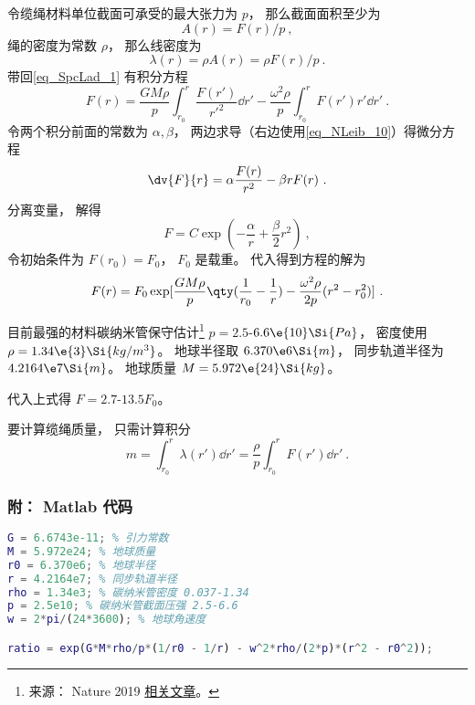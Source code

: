 令缆绳材料单位截面可承受的最大张力为 $p$， 那么截面面积至少为
\begin{equation}
A(r) = F(r)/p~,
\end{equation}
绳的密度为常数 $\rho$， 那么线密度为
\begin{equation}
\lambda(r) = \rho A(r) = \rho F(r)/p~.
\end{equation}
带回\autoref{eq_SpcLad_1} 有积分方程
\begin{equation}
F(r) = \frac{GM\rho}{p} \int_{r_0}^{r} \frac{F(r')}{r'^2} \dd{r'} - \frac{\omega^2\rho}{p}\int_{r_0}^r F(r') r' \dd{r'}~.
\end{equation}
令两个积分前面的常数为 $\alpha, \beta$， 两边求导（右边使用\autoref{eq_NLeib_10}）得微分方程
\begin{equation}
\dv{F}{r} = \alpha \frac{F(r)}{r^2} - \beta r F(r)~.
\end{equation}
分离变量， 解得
\begin{equation}
F = C\exp(-\frac{\alpha}{r} + \frac{\beta}{2} r^2)~,
\end{equation}
令初始条件为 $F(r_0) = F_0$， $F_0$ 是载重。 代入得到方程的解为
\begin{equation}
F(r) = F_0 \exp[\frac{GM\rho}{p} \qty(\frac{1}{r_0} - \frac{1}{r}) - \frac{\omega^2\rho}{2p}(r^2 - r_0^2)]~.
\end{equation}

目前最强的材料碳纳米管保守估计\footnote{来源： Nature 2019 \href{https://www.nature.com/articles/s41467-019-10959-7}{相关文章}。} $p = 2.5$-$6.6\e{10} \Si{Pa}$， 密度使用 $\rho = 1.34\e{3} \Si{kg/m^3}$。 地球半径取 $6.370\e6\Si{m}$， 同步轨道半径为 $4.2164\e7 \Si{m}$。 地球质量 $M = 5.972\e{24} \Si{kg}$。

代入上式得 $F = 2.7$-$13.5 F_0$。

要计算缆绳质量， 只需计算积分
\begin{equation}
m = \int_{r_0}^{r} \lambda(r') \dd{r'} = \frac{\rho}{p} \int_{r_0}^{r} F(r') \dd{r'}~.
\end{equation}

\subsubsection{附： Matlab 代码}
\begin{lstlisting}[language=matlab]
G = 6.6743e-11; % 引力常数
M = 5.972e24; % 地球质量
r0 = 6.370e6; % 地球半径
r = 4.2164e7; % 同步轨道半径
rho = 1.34e3; % 碳纳米管密度 0.037-1.34
p = 2.5e10; % 碳纳米管截面压强 2.5-6.6
w = 2*pi/(24*3600); % 地球角速度

ratio = exp(G*M*rho/p*(1/r0 - 1/r) - w^2*rho/(2*p)*(r^2 - r0^2));
\end{lstlisting}
